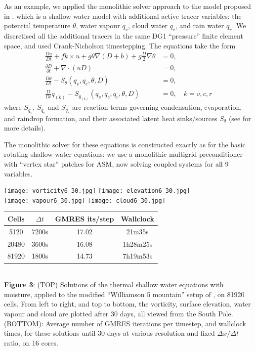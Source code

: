 \documentclass[
]{ImperialPoster}
\newcommand{\pp}[2]{\frac{\partial #1}{\partial #2}}
\newcommand{\DD}[2]{\frac{D #1}{D #2}}
\begin{document}
\begin{multicols}{3}
As an example, we applied the monolithic solver approach
to the model proposed in \cite{zerroukat2015moist}, which is a shallow
water model with additional active tracer variables: the potential
temperature $\theta$, water vapour $q_v$, cloud water $q_c$, and rain
water $q_r$. We discretised all the additional tracers in the same DG1
``pressure'' finite element space, and used Crank-Nicholson timestepping.
The equations take the form
\begin{align*}
  \DD{u}{t} + fk\times u + g\theta \nabla (D+b) + g\frac{D}{2}\nabla \theta
  & = 0, \\
  \pp{D}{t} + \nabla\cdot(uD) & = 0, \\
  \DD{\theta}{t} - S_\theta(q_v, q_c, \theta, D) & = 0, \\
  \DD{}{t}q_{(k)} - S_{q_{(k)}}(q_v, q_c, q_r, \theta, D) & = 0, \quad
  k=v,c,r
\end{align*}
where $S_{q_v}$, $S_{q_c}$ and $S_{q_r}$ are reaction terms governing
condensation, evaporation, and raindrop formation, and their associated
latent heat sinks/sources $S_\theta$ (see \cite{zerroukat2015moist}
for more details).

The monolithic solver for these equations is constructed exactly as for
the basic rotating shallow water equations: we use a monolithic multigrid
preconditioner with ``vertex star'' patches for ASM, now solving coupled
systems for all 9 variables. 

\begin{center}
  \texttt{[image: vorticity6\_30.jpg]}
  \texttt{[image: elevation6\_30.jpg]}\\
  \texttt{[image: vapour6\_30.jpg]}
  \texttt{[image: cloud6\_30.jpg]}\\
  \begin{tabular}{cccc}
    Cells & $\Delta t$ & GMRES its/step & Wallclock \\
    \hline
    5120 & 7200s & 17.02 & 21m35s \\
    20480 & 3600s & 16.08 & 1h28m25s \\
    81920 & 1800s & 14.73 & 7h19m53s \\
  \end{tabular} \\
    \vspace{3mm} {\bfseries Figure 3}: (TOP) Solutions of the thermal
    shallow water equations with moisture, applied to the modified
    ``Williamson 5 mountain'' setup of \cite{zerroukat2015moist}, on
    81920 cells. From left to right, and top to bottom,
    the vorticity, surface elevation, water vapour and cloud are
    plotted after 30 days, all viewed from the South Pole.  (BOTTOM):
    Average number of GMRES iterations per timestep, and wallclock
    times, for these solutions until 30 days at various resolution and
    fixed $\Delta x/\Delta t$ ratio, on 16 cores.
  \end{center}


\end{multicols}
\end{document}
